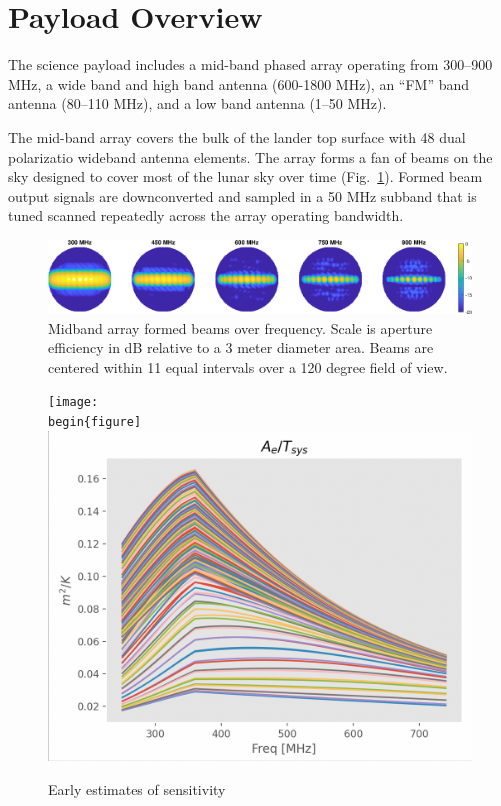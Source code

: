 \documentclass[preprint]{aastex631}
\begin{document}
\section{Payload Overview}
\label{sec:payload}
%

The science payload includes a mid-band phased array operating from 300--900 MHz, a wide band and high band antenna (600-1800 MHz), an ``FM'' band antenna (80--110 MHz), and a low band antenna (1--50 MHz). 

The mid-band array covers the bulk of the lander top surface with 48 dual polarizatio wideband antenna elements. The array forms a fan of beams on the sky designed to cover most of the lunar sky over time (Fig.\ \ref{fig:midband_beam_maps}). Formed beam output signals are downconverted and sampled in a  50 MHz subband that is tuned scanned repeatedly across the array operating bandwidth. 

\begin{figure}
	\centering
	\includegraphics[width=\linewidth]{figures/midband_array_28cm_3dBSLL_beams_max.eps}
	\caption{Midband array formed beams over frequency. Scale is aperture efficiency in dB relative to a 3 meter diameter area. Beams are centered within 11 equal intervals over a 120 degree field of view.}
	\label{fig:midband_beam_maps}
\end{figure}

\begin{figure}
	\centering
	\texttt{[image: \\begin\{figure]}
	\centering
	\includegraphics[width=\linewidth]{figures/sensitivity_early_est.png}
	\caption{Early estimates of sensitivity}
\end{figure}
\end{document}
